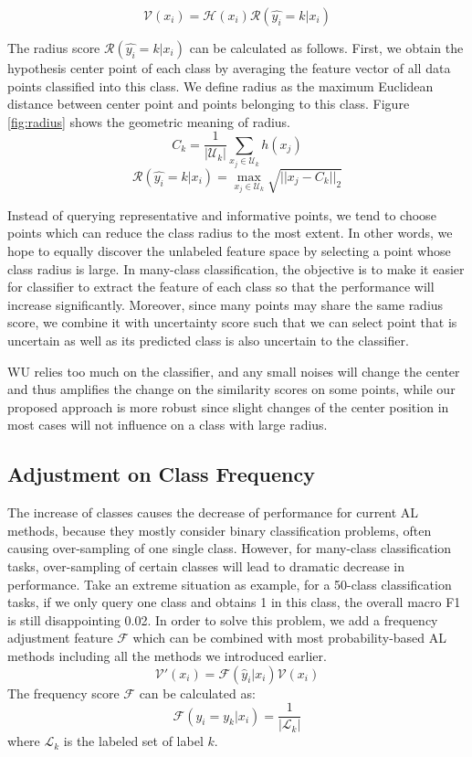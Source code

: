 $$ \mathcal{V}(x_i) = \mathcal{H}(x_i) \mathcal{R}(\hat{y_i}=k|x_i)$$
    
The radius score $\mathcal{R}(\hat{y_i}=k|x_i)$ can be calculated as follows. First, we obtain the hypothesis center point of each class by averaging the feature vector of all data points classified into this class. We define radius as the maximum Euclidean distance between center point and points belonging to this class. Figure \ref{fig:radius} shows the geometric meaning of radius.
    $$C_k = \frac{1}{|\mathcal{U}_k|} \sum_{x_j \in \mathcal{U}_k} h(x_j)$$
    $$\mathcal{R}(\hat{y_i}=k|x_i) = \max_{x_j \in \mathcal{U}_k} \sqrt{||x_j - C_k||_2} $$
    
Instead of querying representative and informative points, we tend to choose points which can reduce the class radius to the most extent. In other words, we hope to equally discover the unlabeled feature space by selecting a point whose class radius is large. In many-class classification, the objective is to make it easier for classifier to extract the feature of each class so that the performance will increase significantly. Moreover, since many points may share the same radius score, we combine it with uncertainty score such that we can select point that is uncertain as well as its predicted class is also uncertain to the classifier.
    
 WU relies too much on the classifier, and any small noises will change the center and thus amplifies the change on the similarity scores on some points, while our proposed approach is more robust since slight changes of the center position in most cases will not influence on a class with large radius.
    
\subsection{Adjustment on Class Frequency}
The increase of classes causes the decrease of performance for
current AL methods, because they mostly consider binary classification problems, 
often causing over-sampling of one single class. However, for many-class classification tasks, over-sampling of certain classes will lead to dramatic decrease in performance. Take an extreme situation as example, for a 50-class classification tasks, if we only query one class and obtains 1 in this class, the overall macro F1 is still disappointing 0.02. In order to solve this problem, we add a frequency adjustment feature 
$\mathcal{F}$ which can be combined with most probability-based AL methods
including all the methods we introduced earlier.
$$\mathcal{V}'(x_i) = \mathcal{F}(\hat{y}_i|x_i) \mathcal{V}(x_i)$$    
The frequency score $\mathcal{F}$ can be calculated as:
$$\mathcal{F}(\hat{y_i} = y_k|x_i) = \frac{1}{|\mathcal{L}_k|}$$    
where $\mathcal{L}_k$ is the labeled set of label $k$.
    
